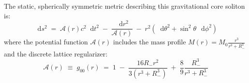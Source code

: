 \documentclass[
    12pt,
    a4paper,
    headings=normal,
    twoside=false,
    open=any,
    parskip=half
]{scrbook}
\newcommand{\diff}{\mathop{}\!\mathrm{d}}
\begin{document}
The static, spherically symmetric metric describing this gravitational core soliton is:
\begin{equation}
\diff s^2 \;=\; \mathcal{A}(r) c^2 \diff t^2 \;-\; \frac{\diff r^2}{\mathcal{A}(r)} \;-\; r^2 \left( \diff\theta^2 + \sin^2\theta \, \diff\phi^2 \right)
\label{eq:ch9_metric_line_element}
\end{equation}
where the potential function $\mathcal{A}(r)$ includes the mass profile $M(r) = M_0 \frac{r^3}{r^3 + R_-^3}$ and the discrete lattice regularizer:
\begin{equation}
\boxed{\mathcal{A}(r) \;\equiv\; g_{00}(r) \;=\; 1 \;-\; \frac{16 R_- r^2}{3\left( r^3 + R_-^3 \right)} \;+\; \frac{8}{9}\frac{R_-^3}{r^3 + R_-^3}}
\label{eq:ch9_regular_potential_formula}
\end{equation}
\end{document}
